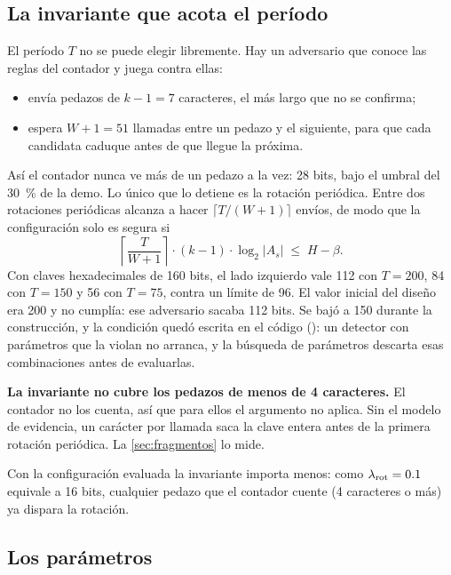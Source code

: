 \subsection{La invariante que acota el período}\label{sec:invariante}

El período $T$ no se puede elegir libremente. Hay un adversario que conoce las reglas del contador y
juega contra ellas:

\begin{itemize}
  \item envía pedazos de $k - 1 = 7$ caracteres, el más largo que no se confirma;
  \item espera $W + 1 = 51$ llamadas entre un pedazo y el siguiente, para que cada candidata caduque
    antes de que llegue la próxima.
\end{itemize}

Así el contador nunca ve más de un pedazo a la vez: 28 bits, bajo el umbral del \qty{30}{\percent} de
la demo. Lo único que lo detiene es la rotación periódica. Entre dos rotaciones periódicas alcanza a
hacer $\lceil T / (W+1) \rceil$ envíos, de modo que la configuración solo es segura si
\begin{equation}
  \left\lceil \frac{T}{W + 1} \right\rceil \cdot (k - 1) \cdot \log_2 |A_s| \;\leq\; H - \beta .
  \label{eq:invariante}
\end{equation}
Con claves hexadecimales de 160 bits, el lado izquierdo vale 112 con $T = 200$, 84 con $T = 150$ y 56
con $T = 75$, contra un límite de 96. El valor inicial del diseño era 200 y no cumplía: ese adversario
sacaba 112 bits. Se bajó a 150 durante la construcción, y la condición quedó escrita en el código
(): un detector con parámetros que la violan no arranca, y la búsqueda de parámetros
descarta esas combinaciones antes de evaluarlas.

\begin{limite}
\textbf{La invariante no cubre los pedazos de menos de 4 caracteres.} El contador no los cuenta, así
que para ellos el argumento no aplica. Sin el modelo de evidencia, un carácter por llamada saca la
clave entera antes de la primera rotación periódica. La \cref{sec:fragmentos} lo mide.
\end{limite}

Con la configuración evaluada la invariante importa menos: como $\lambda_{\mathrm{rot}} = \num{0.1}$ equivale a 16 bits,
cualquier pedazo que el contador cuente (4 caracteres o más) ya dispara la rotación.

\subsection{Los parámetros}\label{sec:parametros}

